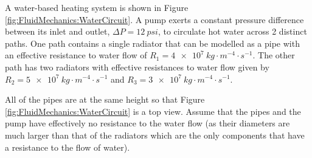 \question A water-based heating system is shown in Figure \ref{fig:FluidMechanics:WaterCircuit}. A pump exerts a constant pressure difference between its inlet and outlet, $\Delta P=\SI{12}{psi}$, to circulate hot water across 2 distinct paths. One path contains a single radiator that can be modelled as a pipe with an effective resistance to water flow of $R_1=\SI{4e7}{kg\cdot m^{-4}\cdot s^{-1}}$. The other path has two radiators with effective resistances to water flow given by $R_2=\SI{5e7}{kg\cdot m^{-4}\cdot s^{-1}}$ and $R_3=\SI{3e7}{kg\cdot m^{-4}\cdot s^{-1}}$. 

All of the pipes are at the same height so that Figure \ref{fig:FluidMechanics:WaterCircuit} is a top view. Assume that the pipes and the pump have effectively no resistance to the water flow (as their diameters are much larger than that of the radiators which are the only components that have a resistance to the flow of water).




